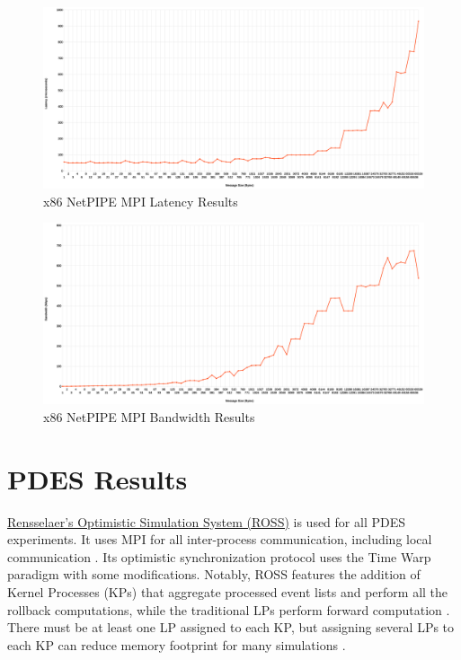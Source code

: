 \documentclass[11pt]{book}
\begin{document}
\begin{figure}
\includegraphics[width=\textwidth]{x86_lat}
\caption{x86 NetPIPE MPI Latency Results}\label{x86-lat}
\end{figure}

\begin{figure}
\includegraphics[width=\textwidth]{x86_bw}
\caption{x86 NetPIPE MPI Bandwidth Results}\label{x86-bw}
\end{figure}

\section{PDES Results}\label{pdes-results}

\href{https://github.com/carothersc/ROSS}{Rensselaer's Optimistic Simulation System
  (ROSS)} is used for all PDES experiments.  It uses MPI for all inter-process
communication, including local communication \cite{carothers-02}.  Its optimistic
synchronization protocol uses the Time Warp paradigm with some modifications.  Notably,
ROSS features the addition of Kernel Processes (KPs) that aggregate processed event lists
and perform all the rollback computations, while the traditional LPs perform forward
computation \cite{carothers-02}.  There must be at least one LP assigned to each KP, but
assigning several LPs to each KP can reduce memory footprint for many simulations
\cite{carothers-02}.
\end{document}
